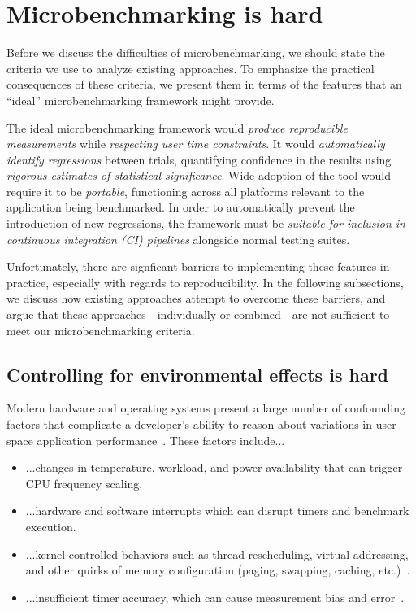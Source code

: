 \documentclass[conference]{IEEEtran}
\begin{document}

\label{sec:challenges}
\section{Microbenchmarking is hard}

Before we discuss the difficulties of microbenchmarking, we should state the criteria we use
to analyze existing approaches. To emphasize the practical consequences of these criteria,
we present them in terms of the features that an ``ideal'' microbenchmarking framework might
provide.

The ideal microbenchmarking framework would \textit{produce reproducible measurements} while
\textit{respecting user time constraints}. It would \textit{automatically identify
regressions} between trials, quantifying confidence in the results using \textit{rigorous
estimates of statistical significance}. Wide adoption of the tool would require it to be
\textit{portable}, functioning across all platforms relevant to the application being
benchmarked. In order to automatically prevent the introduction of new regressions, the
framework must be \textit{suitable for inclusion in continuous integration (CI) pipelines}
alongside normal testing suites.

Unfortunately, there are signficant barriers to implementing these features in practice,
especially with regards to reproducibility. In the following subsections, we discuss how
existing approaches attempt to overcome these barriers, and argue that these approaches -
individually or combined - are not sufficient to meet our microbenchmarking criteria.

\subsection{Controlling for environmental effects is hard}

Modern hardware and operating systems present a large number of confounding factors that
complicate a developer's ability to reason about variations in user-space application
performance~\cite{HP5e}. These factors include...

\begin{itemize}
    \item ...changes in temperature, workload, and power availability that can trigger
    CPU frequency scaling.
    \item ...hardware and software interrupts which can disrupt timers and benchmark
    execution.
    \item ...kernel-controlled behaviors such as thread rescheduling, virtual addressing,
    and other quirks of memory configuration (paging, swapping, caching,
    etc.)~\cite{Oyama2014,Oyama2016}.
    \item ...insufficient timer accuracy, which can cause measurement bias and
    error~\cite{Mytkowicz2009}.
\end{itemize}
\end{document}
